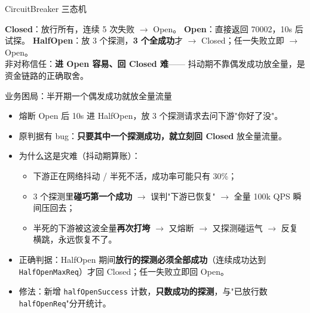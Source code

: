 \documentclass[aspectratio=169,11pt]{beamer}
\begin{document}
\begin{frame}[shrink]{CircuitBreaker 三态机}
\vspace{1mm}
\small \textbf{Closed}：放行所有，连续 5 次失败 $\to$ Open。
\textbf{Open}：直接返回 70002，10s 后试探。
\textbf{HalfOpen}：放 3 个探测，\textbf{3 个全成功}才 $\to$ Closed；任一失败立即 $\to$ Open。\\
非对称信任：\textbf{进 Open 容易、回 Closed 难}—— 抖动期不靠偶发成功放全量，是资金链路的正确取舍。
\end{frame}

\begin{frame}[shrink]{业务困局：半开期一个偶发成功就放全量流量}
\begin{itemize}
  \item 熔断 Open 后 10s 进 HalfOpen，放 3 个探测请求去问下游"你好了没"。
  \item 原判据有 bug：\textbf{只要其中一个探测成功，就立刻回 Closed} 放全量流量。
  \item 为什么这是灾难（抖动期算账）：
  \begin{itemize}
    \item 下游正在网络抖动 / 半死不活，成功率可能只有 30\%；
    \item 3 个探测里\textbf{碰巧第一个成功} $\to$ 误判"下游已恢复" $\to$ 全量 100k QPS 瞬间压回去；
    \item 半死的下游被这波全量\textbf{再次打垮} $\to$ 又熔断 $\to$ 又探测碰运气 $\to$ 反复横跳，永远恢复不了。
  \end{itemize}
  \item 正确判据：HalfOpen 期间\textbf{放行的探测必须全部成功}（连续成功达到 \texttt{HalfOpenMaxReq}）才回 Closed；任一失败立即回 Open。
  \item 修法：新增 \texttt{halfOpenSuccess} 计数，\textbf{只数成功的探测}，与"已放行数 \texttt{halfOpenReq}"分开统计。
\end{itemize}
\end{frame}
\end{document}
